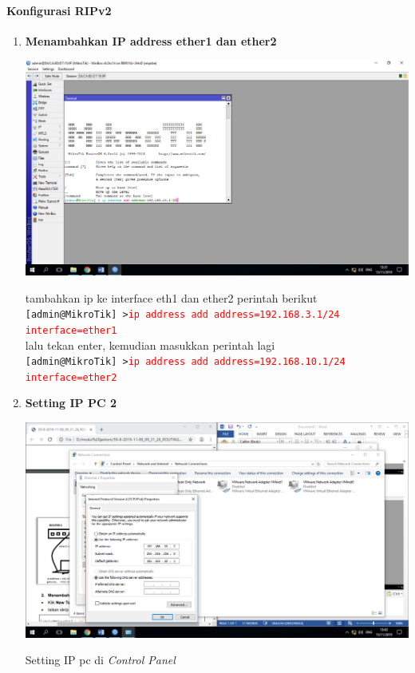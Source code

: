 \documentclass[a4paper,12pt]{article}
\begin{document}
\paragraph{Konfigurasi RIPv2}
\begin{enumerate}
	\item \textbf{Menambahkan IP address ether1 dan ether2}
	\begin{center}
		\includegraphics[scale=.38]{Page-4-Image-8}
	\end{center}
	tambahkan ip ke interface eth1 dan ether2 perintah berikut\\
	\texttt{[admin@MikroTik] >\textcolor{red} {ip address add address=192.168.3.1/24 interface=ether1}}\\
	lalu tekan enter, kemudian masukkan perintah lagi\\
	\texttt{[admin@MikroTik] >\textcolor{red} {ip address add address=192.168.10.1/24 interface=ether2}}\\
	
	\newpage
	
	\item \textbf{Setting IP PC 2}\\
	\begin{center}
		\includegraphics[scale=.4]{Page-5-Image-9}
	\end{center}
	Setting IP  pc di \textit{Control Panel}
	

\end{enumerate}
\end{document}
